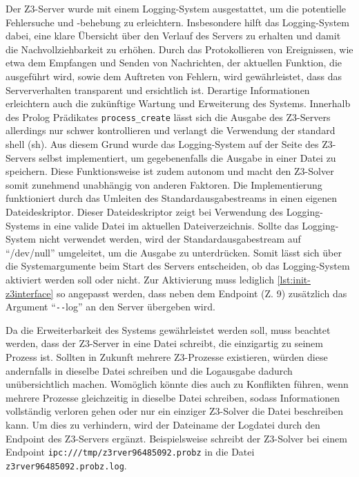 Der Z3-Server wurde mit einem Logging-System ausgestattet, um die potentielle Fehlersuche und -behebung zu erleichtern.
Insbesondere hilft das Logging-System dabei, eine klare Übersicht über den Verlauf des Servers zu erhalten und damit die Nachvollziehbarkeit zu erhöhen.
Durch das Protokollieren von Ereignissen, wie etwa dem Empfangen und Senden von Nachrichten, der aktuellen Funktion, die ausgeführt wird, sowie dem Auftreten von Fehlern,
wird gewährleistet, dass das Serververhalten transparent und ersichtlich ist.
Derartige Informationen erleichtern auch die zukünftige Wartung und Erweiterung des Systems.
Innerhalb des Prolog Prädikates \texttt{process\_create} lässt sich die Ausgabe des Z3-Servers allerdings nur schwer kontrollieren und verlangt die Verwendung der standard shell (sh).
Aus diesem Grund wurde das Logging-System auf der Seite des Z3-Servers selbst implementiert, um gegebenenfalls die Ausgabe in einer Datei zu speichern.
Diese Funktionsweise ist zudem autonom und macht den Z3-Solver somit zunehmend unabhängig von anderen Faktoren.
Die Implementierung funktioniert durch das Umleiten des Standardausgabestreams in einen eigenen Dateideskriptor.
Dieser Dateideskriptor zeigt bei Verwendung des Logging-Systems in eine valide Datei im aktuellen Dateiverzeichnis.
Sollte das Logging-System nicht verwendet werden, wird der Standardausgabestream auf \enquote{/dev/null} umgeleitet, um die Ausgabe zu unterdrücken.
Somit lässt sich über die Systemargumente beim Start des Servers entscheiden, ob das Logging-System aktiviert werden soll oder nicht.
Zur Aktivierung muss lediglich \cref{lst:init-z3interface} so angepasst werden, dass neben dem Endpoint (Z. 9) zusätzlich das Argument \enquote{\texttt{-}\texttt{-}log} an den Server übergeben wird.

Da die Erweiterbarkeit des Systems gewährleistet werden soll, muss beachtet werden, dass der Z3-Server in eine Datei schreibt, die einzigartig zu seinem Prozess ist.
Sollten in Zukunft mehrere Z3-Prozesse existieren, würden diese andernfalls in dieselbe Datei schreiben und die Logausgabe dadurch unübersichtlich machen.
Womöglich könnte dies auch zu Konflikten führen, wenn mehrere Prozesse gleichzeitig in dieselbe Datei schreiben, sodass Informationen vollständig verloren gehen oder nur ein einziger Z3-Solver die Datei beschreiben kann.
Um dies zu verhindern, wird der Dateiname der Logdatei durch den Endpoint des Z3-Servers ergänzt.
Beispielsweise schreibt der Z3-Solver bei einem Endpoint \texttt{ipc:///tmp/z3rver96485092.probz} in die Datei \texttt{z3rver96485092.probz.log}.

